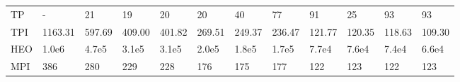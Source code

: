 \begin{table*}
{\begin{tabular}{llllllllllll}
TP       &                - &                21 &                19 &                20 &                20 &                40 &               77 &               91 &               25 &                93 &               93 \\
TPI      &          1163.31 &            597.69 &            409.00 &            401.82 &            269.51 &            249.37 &           236.47 &           121.77 &           120.35 &            118.63 &           109.30 \\
HEO      &            1.0e6 &             4.7e5 &             3.1e5 &             3.1e5 &             2.0e5 &             1.8e5 &            1.7e5 &            7.7e4 &            7.6e4 &             7.4e4 &            6.6e4 \\
MPI      &              386 &               280 &               229 &               228 &               176 &               175 &              177 &              122 &              123 &               122 &              123 \\
\bottomrule
\end{tabular}}
\end{table*}



